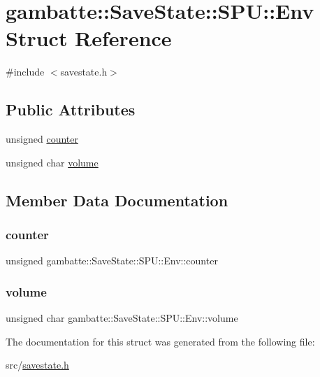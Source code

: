 \hypertarget{structgambatte_1_1SaveState_1_1SPU_1_1Env}{}\section{gambatte\+:\+:Save\+State\+:\+:S\+PU\+:\+:Env Struct Reference}
\label{structgambatte_1_1SaveState_1_1SPU_1_1Env}


{\ttfamily \#include $<$savestate.\+h$>$}

\subsection*{Public Attributes}
\begin{DoxyCompactItemize}
\item 
unsigned \hyperlink{structgambatte_1_1SaveState_1_1SPU_1_1Env_a7b82be49c81e3e4ceaba2298c706a03c}{counter}
\item 
unsigned char \hyperlink{structgambatte_1_1SaveState_1_1SPU_1_1Env_a3433ecacf201c5bd40b7c3606cc39445}{volume}
\end{DoxyCompactItemize}


\subsection{Member Data Documentation}
\mbox{\label{structgambatte_1_1SaveState_1_1SPU_1_1Env_a7b82be49c81e3e4ceaba2298c706a03c}} 
\subsubsection{\texorpdfstring{counter}{counter}}
{\footnotesize\ttfamily unsigned gambatte\+::\+Save\+State\+::\+S\+P\+U\+::\+Env\+::counter}

\mbox{\label{structgambatte_1_1SaveState_1_1SPU_1_1Env_a3433ecacf201c5bd40b7c3606cc39445}} 
\subsubsection{\texorpdfstring{volume}{volume}}
{\footnotesize\ttfamily unsigned char gambatte\+::\+Save\+State\+::\+S\+P\+U\+::\+Env\+::volume}



The documentation for this struct was generated from the following file\+:\begin{DoxyCompactItemize}
\item 
src/\hyperlink{savestate_8h}{savestate.\+h}\end{DoxyCompactItemize}
